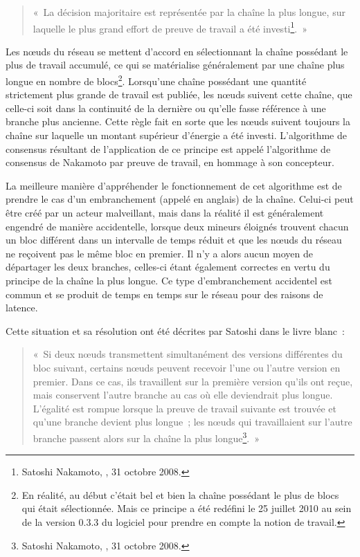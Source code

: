 \begin{quote}
«~La décision majoritaire est représentée par la chaîne la plus longue, sur laquelle le plus grand effort de preuve de travail a été investi\footnote{Satoshi Nakamoto, , 31 octobre 2008.}.~»
\end{quote}

Les nœuds du réseau se mettent d'accord en sélectionnant la chaîne possédant le plus de travail accumulé, ce qui se matérialise généralement par une chaîne plus longue en nombre de blocs\footnote{En réalité, au début c'était bel et bien la chaîne possédant le plus de blocs qui était sélectionnée. Mais ce principe a été redéfini le 25 juillet 2010 au sein de la version 0.3.3 du logiciel pour prendre en compte la notion de travail.}. Lorsqu'une chaîne possédant une quantité strictement plus grande de travail est publiée, les nœuds suivent cette chaîne, que celle-ci soit dans la continuité de la dernière ou qu'elle fasse référence à une branche plus ancienne. Cette règle fait en sorte que les nœuds suivent toujours la chaîne sur laquelle un montant supérieur d'énergie a été investi. L'algorithme de consensus résultant de l'application de ce principe est appelé l'algorithme de consensus de Nakamoto par preuve de travail, en hommage à son concepteur.


La meilleure manière d'appréhender le fonctionnement de cet algorithme est de prendre le cas d'un embranchement (appelé  en anglais) de la chaîne. Celui-ci peut être créé par un acteur malveillant, mais dans la réalité il est généralement engendré de manière accidentelle, lorsque deux mineurs éloignés trouvent chacun un bloc différent dans un intervalle de temps réduit et que les nœuds du réseau ne reçoivent pas le même bloc en premier. Il n'y a alors aucun moyen de départager les deux branches, celles-ci étant également correctes en vertu du principe de la chaîne la plus longue. Ce type d'embranchement accidentel est commun et se produit de temps en temps sur le réseau pour des raisons de latence.

Cette situation et sa résolution ont été décrites par Satoshi dans le livre blanc~:

\begin{quote}
«~Si deux nœuds transmettent simultanément des versions différentes du bloc suivant, certains nœuds peuvent recevoir l'une ou l'autre version en premier. Dans ce cas, ils travaillent sur la première version qu'ils ont reçue, mais conservent l'autre branche au cas où elle deviendrait plus longue. L'égalité est rompue lorsque la preuve de travail suivante est trouvée et qu'une branche devient plus longue~; les nœuds qui travaillaient sur l'autre branche passent alors sur la chaîne la plus longue\footnote{Satoshi Nakamoto, , 31 octobre 2008.}.~»
\end{quote}


